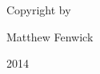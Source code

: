 \newpage
\thispagestyle{empty}
\begin{center}
  Copyright by
  
  Matthew Fenwick
  
  \vfill
  
  2014
\end{center}

